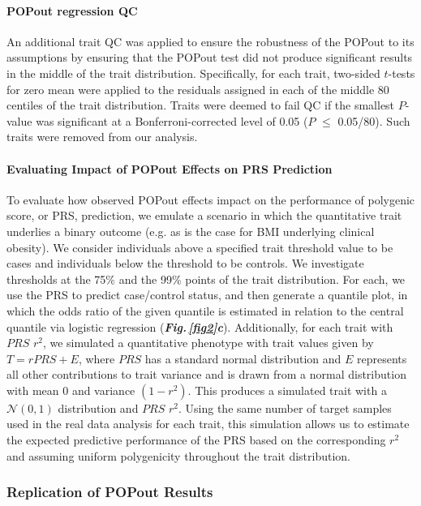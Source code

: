 \documentclass[12pt]{zHenriquesLab-StyleBioRxiv}
\newcommand\dref[2]{\normalsize{\textbf{\textit{Fig.\,\ref{#1}#2}}}\normalsize{}}
\begin{document}
\paragraph*{POPout regression QC}
An additional trait QC was applied to ensure the robustness of the
POPout to its assumptions by ensuring that the POPout test 
did not produce significant results in the middle of the trait distribution. 
Specifically, for each trait, two-sided $t$-tests for zero mean were
applied to the residuals assigned in each of the middle 80 centiles of
the trait distribution. Traits were deemed to fail QC if the smallest
$P$-value was significant at a Bonferroni-corrected level of 0.05 ($P$
$\le$ 0.05/80). Such traits were removed from our analysis.

\paragraph*{Evaluating Impact of POPout Effects on PRS Prediction} 
To evaluate how observed POPout effects impact on the performance of 
polygenic score, or PRS, prediction, we emulate a scenario in which the 
quantitative trait underlies a binary outcome (e.g. as is the case for BMI 
underlying clinical obesity). We consider individuals above a specified 
trait threshold value to be cases and individuals below the threshold to 
be controls. We investigate thresholds at the 75\% and the 99\% points of 
the trait distribution. For each, we use the PRS to predict case/control 
status, and then generate a quantile plot, in which the odds ratio of the 
given quantile is estimated in relation to the central quantile via logistic 
regression (\dref{fig2}{c}). Additionally, for each trait with $PRS$ $r^2$, we simulated 
a quantitative phenotype with trait values given by $T=r{PRS}+E$, where 
$PRS$ has a standard normal distribution and $E$ represents all other contributions 
to trait variance and is drawn from a normal distribution with mean 0 and 
variance $(1-r^2)$. This produces a simulated trait with a $\mathcal{N}(0,1)$ 
distribution and $PRS$ $r^2$. Using the same number of target samples 
used in the real data analysis for each trait, this simulation allows us to 
estimate the expected predictive performance of the PRS based on the 
corresponding $r^2$ and assuming uniform polygenicity throughout the 
trait distribution. 

\subsubsection*{Replication of POPout Results}
\end{document}
